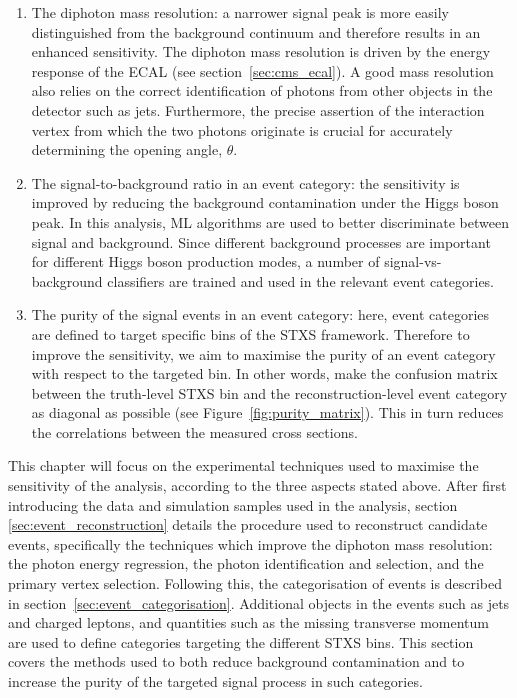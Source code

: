 \begin{enumerate}
    \item The diphoton mass resolution: a narrower signal peak is more easily distinguished from the background continuum and therefore results in an enhanced sensitivity. The diphoton mass resolution is driven by the energy response of the ECAL (see section~\ref{sec:cms_ecal}). A good mass resolution also relies on the correct identification of photons from other objects in the detector such as jets. Furthermore, the precise assertion of the interaction vertex from which the two photons originate is crucial for accurately determining the opening angle, $\theta$.
    
    \item The signal-to-background ratio in an event category: the sensitivity is improved by reducing the background contamination under the Higgs boson peak. In this analysis, ML algorithms are used to better discriminate between signal and background. Since different background processes are important for different Higgs boson production modes, a number of signal-vs-background classifiers are trained and used in the relevant event categories.
    
    \item The purity of the signal events in an event category: here, event categories are defined to target specific bins of the STXS framework. Therefore to improve the sensitivity, we aim to maximise the purity of an event category with respect to the targeted bin. In other words, make the confusion matrix between the truth-level STXS bin and the reconstruction-level event category as diagonal as possible (see Figure~\ref{fig:purity_matrix}). This in turn reduces the correlations between the measured cross sections.
\end{enumerate}

This chapter will focus on the experimental techniques used to maximise the sensitivity of the analysis, according to the three aspects stated above. After first introducing the data and simulation samples used in the analysis, section \ref{sec:event_reconstruction} details the procedure used to reconstruct candidate \Hgg events, specifically the techniques which improve the diphoton mass resolution: the photon energy regression, the photon identification and selection, and the primary vertex selection. Following this, the categorisation of events is described in section~\ref{sec:event_categorisation}. Additional objects in the events such as jets and charged leptons, and quantities such as the missing transverse momentum are used to define categories targeting the different STXS bins. This section covers the methods used to both reduce background contamination and to increase the purity of the targeted signal process in such categories.

